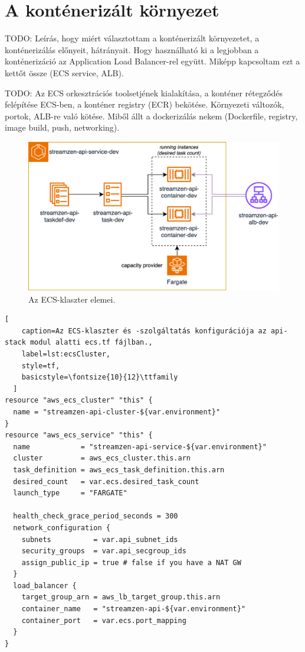 \section{A konténerizált környezet}

TODO: Leírás, hogy miért választottam a konténerizált környezetet, a konténerizálás előnyeit, hátrányait. Hogy használható ki a legjobban a konténerizáció az Application Load Balancer-rel együtt. Miképp kapcsoltam ezt a kettőt össze (ECS service, ALB).

TODO: Az ECS orkesztrációs toolsetjének kialakítása, a konténer rétegződés felépítése ECS-ben, a konténer registry (ECR) bekötése. Környezeti változók, portok, ALB-re való kötése. Miből állt a dockerizálás nekem (Dockerfile, registry, image build, push, networking).

\begin{figure}[ht]
  \centering
  \includegraphics[width=150mm, keepaspectratio]{figures/dipterv_ecs.png}
  \caption{Az ECS-klaszter elemei.}
  \label{fig:ecscluster}
\end{figure}

\begin{minipage}{0.92\textwidth}
  \begin{lstlisting}[
    caption=Az ECS-klaszter és -szolgáltatás konfigurációja az api-stack modul alatti ecs.tf fájlban.,
    label=lst:ecsCluster,
    style=tf,
    basicstyle=\fontsize{10}{12}\ttfamily
  ]
resource "aws_ecs_cluster" "this" {
  name = "streamzen-api-cluster-${var.environment}"
}
resource "aws_ecs_service" "this" {
  name            = "streamzen-api-service-${var.environment}"
  cluster         = aws_ecs_cluster.this.arn
  task_definition = aws_ecs_task_definition.this.arn
  desired_count   = var.ecs.desired_task_count
  launch_type     = "FARGATE"

  health_check_grace_period_seconds = 300
  network_configuration {
    subnets          = var.api_subnet_ids
    security_groups  = var.api_secgroup_ids
    assign_public_ip = true # false if you have a NAT GW
  }
  load_balancer {
    target_group_arn = aws_lb_target_group.this.arn
    container_name   = "streamzen-api-${var.environment}"
    container_port   = var.ecs.port_mapping
  }
}
\end{lstlisting}
\end{minipage}

